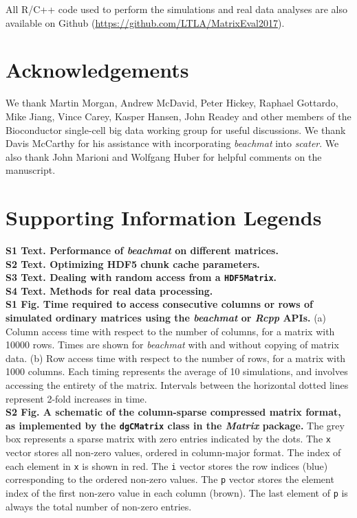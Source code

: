 \documentclass[10pt,letterpaper]{article}
\newcommand{\beachmat}{\textit{beachmat}}
\begin{document}
All R/C++ code used to perform the simulations and real data analyses are also available on Github (\url{https://github.com/LTLA/MatrixEval2017}).

\section*{Acknowledgements}
We thank Martin Morgan, Andrew McDavid, Peter Hickey, Raphael Gottardo, Mike Jiang, Vince Carey, Kasper Hansen, John Readey and other members of the Bioconductor single-cell big data working group for useful discussions.
We thank Davis McCarthy for his assistance with incorporating \beachmat{} into \textit{scater}.
We also thank John Marioni and Wolfgang Huber for helpful comments on the manuscript.



\section*{Supporting Information Legends}

\textbf{S1 Text. Performance of \beachmat{} on different matrices.} 
\\[0.05in]

\noindent
\textbf{S2 Text. Optimizing HDF5 chunk cache parameters.} 
\\[0.05in]

\noindent
\textbf{S3 Text. Dealing with random access from a \texttt{HDF5Matrix}.} 
\\[0.05in]

\noindent
\textbf{S4 Text. Methods for real data processing.} 
\\[0.05in]

\noindent
\textbf{S1 Fig. Time required to access consecutive columns or rows of simulated ordinary matrices using the \beachmat{} or \textit{Rcpp} APIs.}
(a) Column access time with respect to the number of columns, for a matrix with 10000 rows.
Times are shown for \beachmat{} with and without copying of matrix data.
(b) Row access time with respect to the number of rows, for a matrix with 1000 columns.
Each timing represents the average of 10 simulations, and involves accessing the entirety of the matrix.
Intervals between the horizontal dotted lines represent 2-fold increases in time.
\\[0.05in]

\noindent
\textbf{S2 Fig. A schematic of the column-sparse compressed matrix format, as implemented by the \texttt{dgCMatrix} class in the \textit{Matrix} package.}
The grey box represents a sparse matrix with zero entries indicated by the dots.
The \texttt{x} vector stores all non-zero values, ordered in column-major format.
The index of each element in \texttt{x} is shown in red.
The \texttt{i} vector stores the row indices (blue) corresponding to the ordered non-zero values.
The \texttt{p} vector stores the element index of the first non-zero value in each column (brown).
The last element of \texttt{p} is always the total number of non-zero entries.
\\[0.05in]
\end{document}
